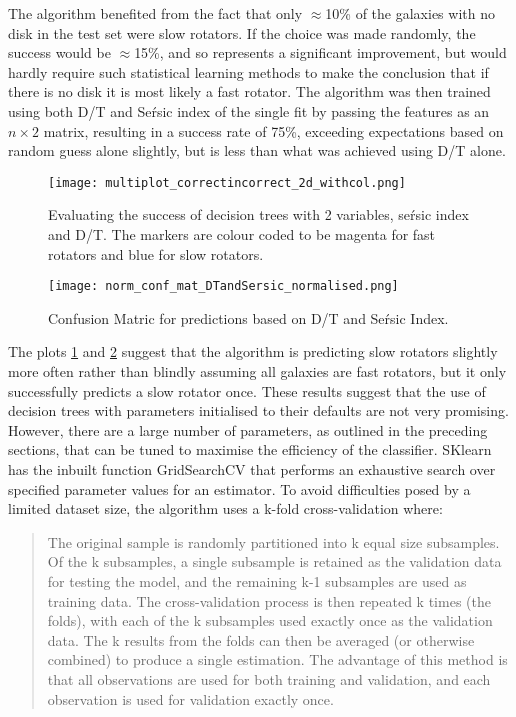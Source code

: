 The algorithm benefited from the fact that only $\approx$10\% of the galaxies with no disk in the test set were slow rotators. If the choice was made randomly, the success would be $\approx$15\%, and so represents a significant improvement, but would hardly require such statistical learning methods to make the conclusion that if there is no disk it is most likely a fast rotator.
The algorithm was then trained using both D/T and Se\'rsic index of the single fit by passing the features as an $n\times 2$ matrix, resulting in a success rate of 75\%, exceeding expectations based on random guess alone slightly, but is less than what was achieved using D/T alone. 
\begin{figure}[h!]
	\centering
	\texttt{[image: multiplot\_correctincorrect\_2d\_withcol.png]}
	\caption{Evaluating the success of decision trees with 2 variables, se\'rsic index and D/T. The markers are colour coded to be magenta for fast rotators and blue for slow rotators.
	}
	\label{fig:correctvsincorrect}
\end{figure}
\begin{figure}[h!]
	\centering
	\texttt{[image: norm\_conf\_mat\_DTandSersic\_normalised.png]}
	\caption{Confusion Matric for predictions based on D/T and Se\'rsic Index.
	}
	\label{fig:confmatDT}
\end{figure}
The plots \ref{fig:correctvsincorrect} and \ref{fig:confmatDT} suggest that the algorithm is predicting slow rotators slightly more often rather than blindly assuming all galaxies are fast rotators, but it only successfully predicts a slow rotator once.
These results suggest that the use of decision trees with parameters initialised to their defaults are not very promising. However, there are a large number of parameters, as outlined in the preceding sections, that can be tuned to maximise the efficiency of the classifier. SKlearn has the inbuilt function GridSearchCV that performs an exhaustive search over specified parameter values for an estimator. To avoid difficulties posed by a limited dataset size, the algorithm uses a k-fold cross-validation where:
\begin{quotation}
	The original sample is randomly partitioned into k equal size subsamples. Of the k subsamples, a single subsample is retained as the validation data for testing the model, and the remaining k-1 subsamples are used as training data. The cross-validation process is then repeated k times (the folds), with each of the k subsamples used exactly once as the validation data. The k results from the folds can then be averaged (or otherwise combined) to produce a single estimation. The advantage of this method is that all observations are used for both training and validation, and each observation is used for validation exactly once.\cite{vanschoren}
\end{quotation}
